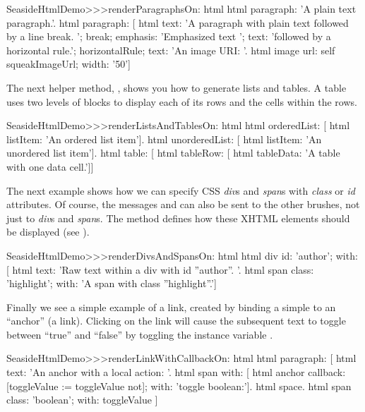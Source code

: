 \documentclass[a4paper,10pt,twoside]{book}
\begin{document}
\begin{code}{}
SeasideHtmlDemo>>>renderParagraphsOn: html 
	html paragraph: 'A plain text paragraph.'.
	html paragraph: [
		html
			text: 'A paragraph with plain text followed by a line break. ';
			break;
			emphasis: 'Emphasized text ';
			text: 'followed by a horizontal rule.';
			horizontalRule;
			text: 'An image URI: '.
		html image
			url: self squeakImageUrl;
			width: '50']
\end{code}

The next helper method, , shows you how to generate lists and tables.
A table uses two levels of blocks to display each of its rows and the cells within the rows.

\begin{code}{}
SeasideHtmlDemo>>>renderListsAndTablesOn: html 
	html orderedList: [
		html listItem: 'An ordered list item'].
	html unorderedList: [
		html listItem: 'An unordered list item'].
	html table: [
		html tableRow: [
			html tableData: 'A table with one data cell.']]
\end{code}

The next example shows how we can specify CSS \emph{div}s and \emph{span}s with \emph{class} or \emph{id} attributes.
Of course, the messages  and  can also be sent to the other brushes, not just to \emph{div}s and \emph{span}s.
The method  defines how these XHTML elements should be displayed (see ).

\begin{code}{}
SeasideHtmlDemo>>>renderDivsAndSpansOn: html 
	html div
		id: 'author';
		with: [
			html text: 'Raw text within a div with id ''author''. '.
			html span
				class: 'highlight';
				with: 'A span with class ''highlight''.']
\end{code}

Finally we see a simple example of a link, created by binding a simple  to an ``anchor'' (\ie a link).
Clicking on the link will cause the subsequent text to toggle between ``true'' and ``false'' by toggling the instance variable .

\begin{code}{}
SeasideHtmlDemo>>>renderLinkWithCallbackOn: html 
	html paragraph: [
		html text: 'An anchor with a local action: '.
		html span with: [
			html anchor
				callback: [toggleValue := toggleValue not];
				with: 'toggle boolean:'].
		html space.
		html span
			class: 'boolean';
			with: toggleValue ]
\end{code}
\end{document}
